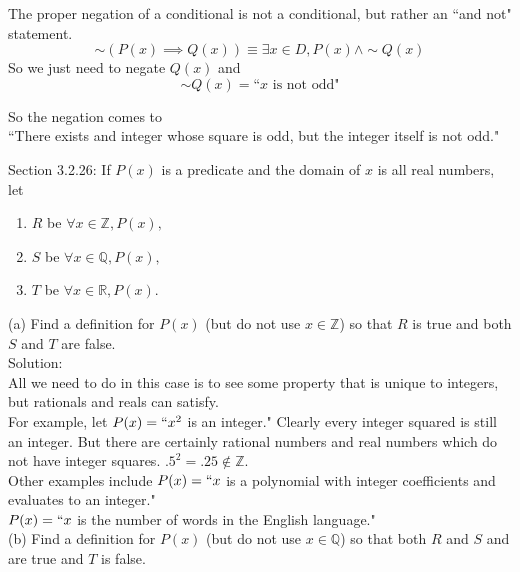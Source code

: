 \documentclass[10 pt]{amsart}
\theoremstyle{definition}
\theoremstyle{remark}
\numberwithin{equation}{subsection}
\newcommand{\R}{\mathbb{R}}
\newcommand{\Z}{\mathbb{Z}}
\newcommand{\Q}{\mathbb{Q}}
\begin{document}
The proper negation of a conditional is not a conditional, but rather an ``and not" statement.
\[
\sim (P(x)\implies Q(x)) \equiv \exists x\in D,P(x)\wedge \sim Q(x)
\]
So we just need to negate $Q(x)$ and\\
\[
\sim Q(x) = \text{``} x \text{ is not odd"}
\]

So the negation comes to\\
``There exists and integer whose square is odd, but the integer itself is not odd."

\newpage

Section 3.2.26: If $P(x)$ is a predicate and the domain of $x$ is all real numbers, let\\
\begin{enumerate}
\item[] $R$ be $\forall x\in\Z, P(x),$\\
\item[] $S$ be $\forall x\in\Q, P(x),$\\
\item[] $T$ be $\forall x\in\R, P(x).$\\
\end{enumerate}

(a) Find a definition for $P(x)$ (but do not use $x\in\Z$) so that $R$ is true and both $S$ and $T$ are false.\\

Solution:\\
All we need to do in this case is to see some property that is unique to integers, but rationals and reals can satisfy.\\

For example, let $P(x) = ``x^2$ is an integer."  Clearly every integer squared is still an integer.  But there are certainly rational numbers and real numbers which do not have integer squares.  $.5^2 = .25\notin \Z$.\\

Other examples include $P(x) = ``x$ is a polynomial with integer coefficients and evaluates to an integer."\\
$P(x) = `` x $ is the number of words in the English language."\\

  


(b) Find a definition for $P(x)$ (but do not use $x\in\Q$) so that both $R$ and $S$ and are true and $T$ is false.\\
\end{document}
